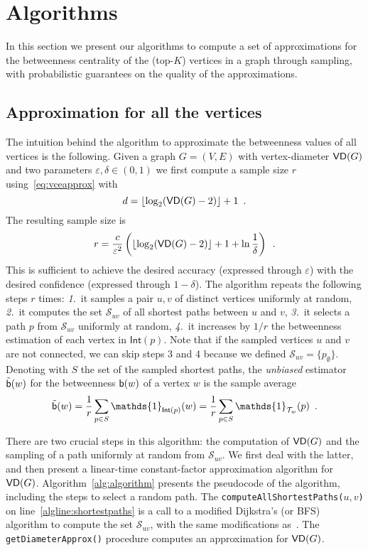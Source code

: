 \section{Algorithms}\label{sec:algo}
In this section we present our algorithms to compute a set of approximations for the
betweenness centrality of the (top-$K$) vertices in a graph through sampling,
with probabilistic guarantees on the quality of the approximations.

\subsection{Approximation for all the vertices}\label{sec:allvertapprox}
The intuition behind the algorithm to approximate the betweenness values of all
vertices is the following. Given a graph $G=(V,E)$
with vertex-diameter $\mathsf{VD}(G)$ and two parameters $\varepsilon,\delta\in(0,1)$
we first compute a sample size $r$ using~\eqref{eq:vceapprox} with
\[d=\lfloor\log_2(\mathsf{VD}(G)-2)\rfloor+1\enspace.\]
The resulting sample size is
\begin{equation}\label{eq:samplesize}
r=\frac{c}{\varepsilon^2}\left(\lfloor\log_2(\VD(G)-2)\rfloor+1+\ln\frac{1}{\delta}\right)\enspace.
\end{equation}
This is sufficient to achieve the desired accuracy
(expressed through $\varepsilon$) with the desired confidence (expressed through
$1-\delta$). The algorithm repeats the following steps $r$ times:
\emph{1.}~it samples a pair $u,v$ of distinct vertices uniformly at random,
\emph{2.}~it
computes the set $\mathcal{S}_{uv}$ of all shortest paths between $u$ and $v$,
\emph{3.}~it selects a path $p$ from $\mathcal{S}_{uv}$ uniformly at random,
\emph{4.}~it increases by $1/r$ the betweenness estimation of each vertex in
$\mathsf{Int}(p)$. Note that if the sampled vertices $u$ and $v$ are not
connected, we can skip steps 3 and 4 because we defined
$\mathcal{S}_{uv}=\{p_\emptyset\}$. Denoting with $S$ the set of the sampled
shortest paths, the \emph{unbiased} estimator $\tilde{\mathsf{b}}(w)$ for the betweenness
$\mathsf{b}(w)$ of a vertex $w$ is the sample average 
\[
\tilde\betw(w) = \frac{1}{r}\sum_{p\in S}
\mathds{1}_{\mathsf{Int}(p)}(w) = \frac{1}{r}\sum_{p\in S}
\mathds{1}_{\mathcal{T}_w}(p)\enspace.
\]

There are two crucial steps in this algorithm: the computation of $\mathsf{VD}(G)$ and
the sampling of a path uniformly at random from $\mathcal{S}_{uv}$. We first
deal with the latter, and then present a linear-time constant-factor approximation algorithm for $\mathsf{VD}(G)$.
Algorithm~\ref{alg:algorithm} presents the pseudocode of the algorithm,
including the steps to select a random path.  The
\texttt{computeAllShortestPaths(}$u,v$\texttt{)}  on
line~\ref{algline:shortestpaths} is a call to a modified Dijkstra's (or BFS)
algorithm to compute the set $\mathcal{S}_{uv}$, with the same modifications
as~\citep{Brandes01}. The \texttt{getDiameterApprox()} procedure computes an approximation for $\mathsf{VD}(G)$. %



